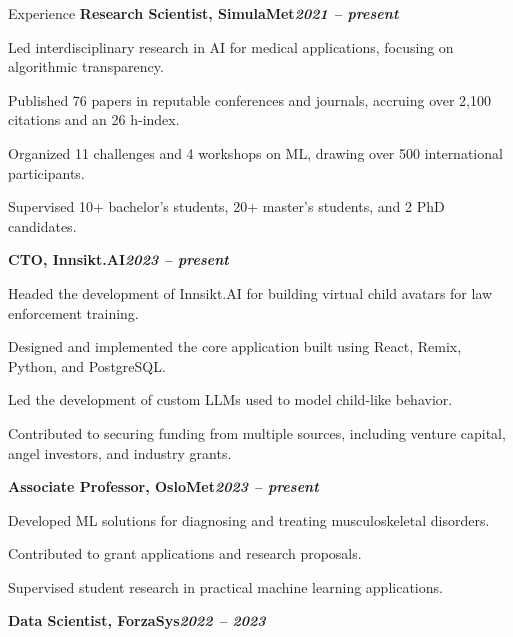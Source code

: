 \begin{rubric}{Experience}
%
\entry*[]%
\textbf{Research Scientist, SimulaMet\hfill\textit{2021 -- present}} \par
\begin{compactitem}
    \item Led interdisciplinary research in AI for medical applications, focusing on algorithmic transparency.
    \item Published 76 papers in reputable conferences and journals, accruing over 2,100 citations and an 26 h-index.
    \item Organized 11 challenges and 4 workshops on ML, drawing over 500 international participants.
    \item Supervised 10+ bachelor's students, 20+ master's students, and 2 PhD candidates.
    \vspace{-12pt}
\end{compactitem}
%
\entry*[]%
\textbf{CTO, Innsikt.AI\hfill\textit{2023 -- present}} \par
\begin{compactitem}
    \item Headed the development of Innsikt.AI for building virtual child avatars for law enforcement training.
    \item Designed and implemented the core application built using React, Remix, Python, and PostgreSQL.
    \item Led the development of custom LLMs used to model child-like behavior.
    \item Contributed to securing funding from multiple sources, including venture capital, angel investors, and industry grants.
    \vspace{-12pt}
\end{compactitem}
%
\entry*[]%
\textbf{Associate Professor, OsloMet\hfill\textit{2023 -- present}} \par
\begin{compactitem}
    \item Developed ML solutions for diagnosing and treating musculoskeletal disorders.
    \item Contributed to grant applications and research proposals.
    \item Supervised student research in practical machine learning applications.
    \vspace{-12pt}
\end{compactitem}
%
\entry*[]%
\textbf{Data Scientist, ForzaSys\hfill\textit{2022 -- 2023}} \par

\end{rubric}
